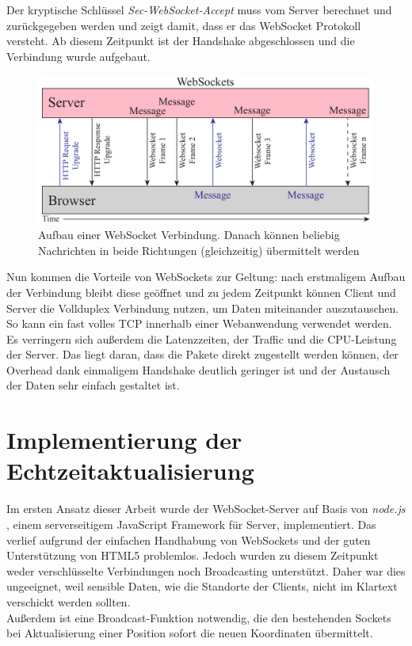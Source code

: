 Der kryptische Schlüssel \emph{Sec-WebSocket-Accept} muss vom Server berechnet und zurückgegeben werden und zeigt damit, dass er das WebSocket Protokoll versteht. Ab diesem Zeitpunkt ist der Handshake abgeschlossen und die Verbindung wurde aufgebaut.\par

\begin{figure}[!ht]
	\centering
	\includegraphics[width=15cm]{fig/websockets}
	\caption[Aufbau einer WebSocket Verbindung]{Aufbau einer WebSocket Verbindung. Danach können beliebig Nachrichten in beide Richtungen (gleichzeitig) übermittelt werden {\cite[S. 7]{ws}}}
\end{figure}

Nun kommen die Vorteile von WebSockets zur Geltung: nach erstmaligem Aufbau der Verbindung bleibt diese geöffnet und zu jedem Zeitpunkt können Client und Server die Vollduplex Verbindung nutzen, um Daten miteinander auszutauschen. So kann ein fast volles TCP innerhalb einer Webanwendung verwendet werden.\\
Es verringern sich außerdem die Latenzzeiten, der Traffic und die CPU-Leistung der Server. Das liegt daran, dass die Pakete direkt zugestellt werden können, der Overhead dank einmaligem Handshake deutlich geringer ist und der Austausch der Daten sehr einfach gestaltet ist. 


\section{Implementierung der Echtzeitaktualisierung}
Im ersten Ansatz dieser Arbeit wurde der WebSocket-Server auf Basis von \emph{node.js} \cite{node.js}, einem serverseitigem JavaScript Framework für Server, implementiert. Das verlief aufgrund der einfachen Handhabung von WebSockets und der guten Unterstützung von HTML5 problemlos. Jedoch wurden zu diesem Zeitpunkt weder verschlüsselte Verbindungen noch Broadcasting unterstützt. Daher war dies ungeeignet, weil sensible Daten, wie die Standorte der Clients, nicht im Klartext verschickt werden sollten.\\
Außerdem ist eine Broadcast-Funktion notwendig, die den bestehenden Sockets bei Aktualisierung einer Position sofort die neuen Koordinaten übermittelt.\par


